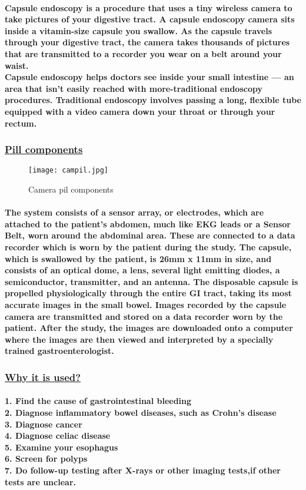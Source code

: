 \documentclass[12pt]{article}
\begin{document}
        \paragraph{Capsule endoscopy is a procedure that uses a tiny wireless camera to take pictures of your digestive tract. A capsule endoscopy camera sits inside a vitamin-size capsule you swallow. As the capsule travels through your digestive tract, the camera takes thousands of pictures that are transmitted to a recorder you wear on a belt around your waist.
        \\Capsule endoscopy helps doctors see inside your small intestine — an area that isn't easily reached with more-traditional endoscopy procedures. Traditional endoscopy involves passing a long, flexible tube equipped with a video camera down your throat or through your rectum.}
        \subsubsection{\underline{Pill components}}
        \begin{figure}[h]
        	\texttt{[image: campil.jpg]}
        	\caption{Camera pil components}
        \end{figure}
        \paragraph{The system consists of a sensor array, or electrodes, which are attached to the patient's abdomen, much like EKG leads or a Sensor Belt, worn around the abdominal area. These are connected to a data recorder which is worn by the patient during the study. The capsule, which is swallowed by the patient, is \textbf{26mm x 11mm} in size, and consists of an optical dome, a lens, several light emitting diodes, a semiconductor, transmitter, and an antenna. The disposable capsule is propelled physiologically through the entire GI tract, taking its most accurate images in the small bowel. Images recorded by the capsule camera are transmitted and stored on a data recorder worn by the patient. After the study, the images are downloaded onto a computer where the images are then viewed and interpreted by a specially trained gastroenterologist.
        }
        \subsubsection{\underline{Why it is used?}}
        \paragraph{\textbf{1.}  Find the cause of gastrointestinal bleeding
        	\\\textbf{2.}  Diagnose inflammatory bowel diseases, such as Crohn's disease
        	\\\textbf{3.}  Diagnose cancer
        	\\\textbf{4.}  Diagnose celiac disease
        	\\\textbf{5.}  Examine your esophagus
        	\\\textbf{6.}  Screen for polyps
        	\\\textbf{7.}  Do follow-up testing after X-rays or other imaging tests,if other tests are unclear.
        }
\end{document}
